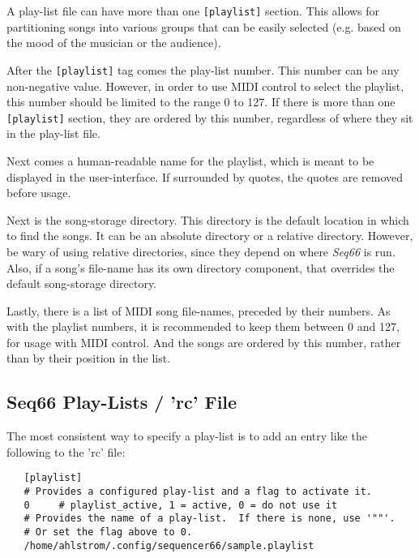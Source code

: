    A play-list file can have more than one \texttt{[playlist]} section.  This
   allows for partitioning songs into various groups that can be easily
   selected (e.g. based on the mood of the musician or the audience).

   After the \texttt{[playlist]} tag comes the play-list number.
   This number can be any non-negative value.
   However, in order to use MIDI control to select the playlist, this number
   should be limited to the range 0 to 127.
   If there is more than one \texttt{[playlist]} section, they are ordered by
   this number, regardless of where they sit in the play-list file.

   Next comes a human-readable name for the playlist, which is meant to be
   displayed in the user-interface.  If surrounded by quotes, the quotes are
   removed before usage.

   Next is the song-storage directory.
   This directory is the default location in which to find the songs.
   It can be an absolute directory or a relative directory.
   However, be wary of using relative directories, since they depend on where
   \textsl{Seq66} is run.
   Also, if a song's file-name  has its own directory component, that overrides
   the default song-storage directory.

   Lastly, there is a list of MIDI song file-names, preceded by their numbers.
   As with the playlist numbers, it is recommended to keep them between 0 and
   127, for usage with MIDI control.  And the songs are ordered by this number,
   rather than by their position in the list.

\subsection{Seq66 Play-Lists / 'rc' File}
\label{subsec:playlist_rc_file}

   The most consistent way to specify a play-list is to add an entry like the
   following to the 'rc' file:

   \begin{verbatim}
   [playlist]
   # Provides a configured play-list and a flag to activate it.
   0     # playlist_active, 1 = active, 0 = do not use it
   # Provides the name of a play-list.  If there is none, use '""'.
   # Or set the flag above to 0.
   /home/ahlstrom/.config/sequencer66/sample.playlist
   \end{verbatim}

